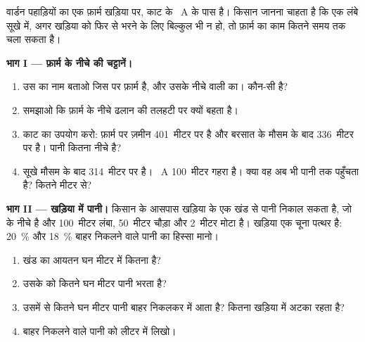 \begin{problem}
\label{pb:g6:water-underground:1}
वार्डन पहाड़ियों का एक फ़ार्म खड़िया पर, काट के ~A के पास है। किसान जानना
चाहता है कि एक लंबे सूखे में, अगर खड़िया को फिर से भरने के लिए बिल्कुल भी
 न हो, तो  फ़ार्म का काम कितने समय तक चला सकता है।

\medskip
\noindent\textbf{भाग I --- फ़ार्म के नीचे की चट्टानें।}
\begin{enumerate}
  \item उस  का नाम बताओ जिस पर फ़ार्म है, और उसके नीचे वाली  का।
        कौन-सी  है?
  \item समझाओ कि फ़ार्म के नीचे ढलान की तलहटी पर  क्यों बहता है।
  \item काट का उपयोग करो: फ़ार्म पर ज़मीन 401~मीटर पर है और बरसात के मौसम के
        बाद  336~मीटर पर है। पानी कितना नीचे है?
  \item सूखे मौसम के बाद  314~मीटर पर है। ~A 100~मीटर
        गहरा है। क्या वह अब भी पानी तक पहुँचता है? कितने मीटर से?
\end{enumerate}

\medskip
\noindent\textbf{भाग II --- खड़िया में पानी।}
किसान  के आसपास खड़िया के एक खंड से पानी निकाल सकता है, जो  के
नीचे है और 100~मीटर लंबा, 50~मीटर चौड़ा और 2~मीटर मोटा है। खड़िया एक चूना पत्थर
है: 20~\%  और 18~\% बाहर निकलने वाले पानी का हिस्सा मानो।
\begin{enumerate}[resume]
  \item खंड का आयतन घन मीटर में कितना है?
  \item उसके  को कितने घन मीटर पानी भरता है?
  \item उसमें से कितने घन मीटर पानी बाहर निकलकर  में आता है? कितना
        खड़िया में अटका रहता है?
  \item बाहर निकलने वाले पानी को लीटर में लिखो।
\end{enumerate}


\end{problem}
